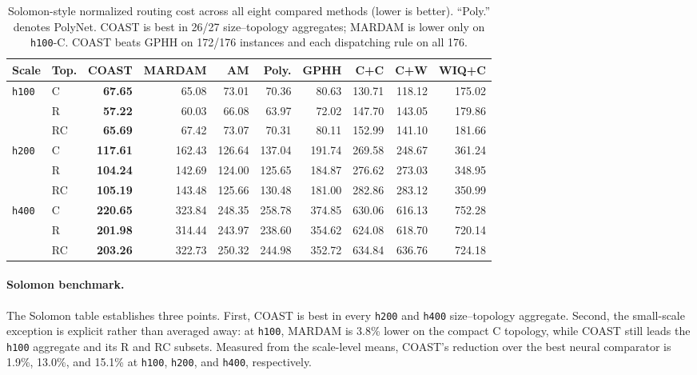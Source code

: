 \documentclass[letterpaper]{article}
\begin{document}
\begin{table}[t]
\centering
{\footnotesize
\setlength{\tabcolsep}{1.35pt}
\begin{tabular}{llrrrrrrrr}
\toprule
Scale & Top. & COAST & MARDAM & AM & Poly. & GPHH & C+C & C+W & WIQ+C \\
\midrule
\texttt{h100} & C  & \textbf{67.65} & 65.08 & 73.01 & 70.36 & 80.63 & 130.71 & 118.12 & 175.02 \\
               & R  & \textbf{57.22} & 60.03 & 66.08 & 63.97 & 72.02 & 147.70 & 143.05 & 179.86 \\
               & RC & \textbf{65.69} & 67.42 & 73.07 & 70.31 & 80.11 & 152.99 & 141.10 & 181.66 \\
\addlinespace
\texttt{h200} & C  & \textbf{117.61} & 162.43 & 126.64 & 137.04 & 191.74 & 269.58 & 248.67 & 361.24 \\
               & R  & \textbf{104.24} & 142.69 & 124.00 & 125.65 & 184.87 & 276.62 & 273.03 & 348.95 \\
               & RC & \textbf{105.19} & 143.48 & 125.66 & 130.48 & 181.00 & 282.86 & 283.12 & 350.99 \\
\addlinespace
\texttt{h400} & C  & \textbf{220.65} & 323.84 & 248.35 & 258.78 & 374.85 & 630.06 & 616.13 & 752.28 \\
               & R  & \textbf{201.98} & 314.44 & 243.97 & 238.60 & 354.62 & 624.08 & 618.70 & 720.14 \\
               & RC & \textbf{203.26} & 322.73 & 250.32 & 244.98 & 352.72 & 634.84 & 636.76 & 724.18 \\
\bottomrule
\end{tabular}
}
\caption{Solomon-style normalized routing cost across all eight compared methods (lower is better). ``Poly.'' denotes PolyNet. COAST is best in 26/27 size--topology aggregates; MARDAM is lower only on \texttt{h100}-C. COAST beats GPHH on 172/176 instances and each dispatching rule on all 176.}
\label{tab:rq1_solomon}
\end{table}

\paragraph{Solomon benchmark.} The Solomon table establishes three points. First, COAST is best in every \texttt{h200} and \texttt{h400} size--topology aggregate. Second, the small-scale exception is explicit rather than averaged away: at \texttt{h100}, MARDAM is 3.8\% lower on the compact C topology, while COAST still leads the \texttt{h100} aggregate and its R and RC subsets. Measured from the scale-level means, COAST's reduction over the best neural comparator is 1.9\%, 13.0\%, and 15.1\% at \texttt{h100}, \texttt{h200}, and \texttt{h400}, respectively.
\end{document}

